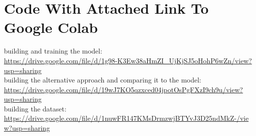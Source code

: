 \section*{Code With Attached Link To Google Colab}
building and training the model:\\
\url{https://drive.google.com/file/d/1g98-K3Ew38aHmZI_UjKjSJ5oHohP6wZn/view?usp=sharing} \\ \newline
building the alternative approach and comparing it to the model: \\
\url{https://drive.google.com/file/d/19wJ7KO5qzxced04jpotOsPgFXzI9ch9u/view?usp=sharing}  \\ \newline
building the dataset: \\
\url{https://drive.google.com/file/d/1nuwFR147KMsDrmzwjBTYvJ3D25ndMkZ-/view?usp=sharing}